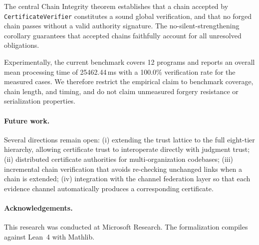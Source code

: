 \documentclass[11pt]{article}
\begin{document}
The central Chain Integrity theorem establishes that a chain accepted
by \texttt{CertificateVerifier} constitutes a sound global verification,
and that no forged chain passes without a valid authority signature.
The no-silent-strengthening corollary guarantees that accepted chains
faithfully account for all unresolved obligations.

Experimentally, the current benchmark covers 12 programs and reports an
overall mean processing time of 25462.44\,ms with a 100.0\%
verification rate for the measured cases.  We therefore restrict the
empirical claim to benchmark coverage, chain length, and timing, and do
not claim unmeasured forgery resistance or serialization properties.

\paragraph{Future work.}
Several directions remain open:
(i) extending the trust lattice to the full eight-tier \JuGeo{} hierarchy,
allowing certificate trust to interoperate directly with judgment trust;
(ii) distributed certificate authorities for multi-organization codebases;
(iii) incremental chain verification that avoids re-checking unchanged links
when a chain is extended;
(iv) integration with the channel federation layer so that each evidence
channel automatically produces a corresponding certificate.

\paragraph{Acknowledgements.}
This research was conducted at Microsoft Research.
The \LEAN{} formalization compiles against Lean~4 with Mathlib.
\end{document}
